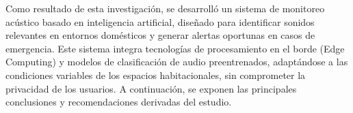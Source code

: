 
Como resultado de esta investigación, se desarrolló un sistema de monitoreo acústico basado en inteligencia artificial, diseñado para identificar sonidos relevantes en entornos domésticos y generar alertas oportunas en casos de emergencia. Este sistema integra tecnologías de procesamiento en el borde (Edge Computing) y modelos de clasificación de audio preentrenados, adaptándose a las condiciones variables de los espacios habitacionales, sin comprometer la privacidad de los usuarios. A continuación, se exponen las principales conclusiones y recomendaciones derivadas del estudio.




